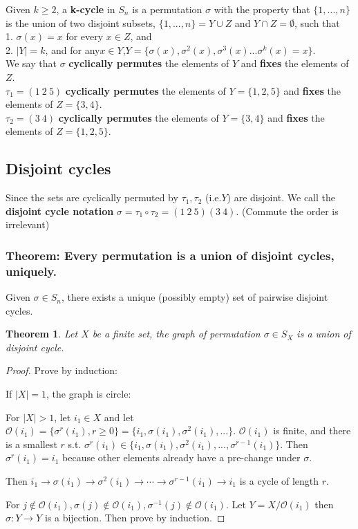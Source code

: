 \documentclass[11pt,a4paper]{article}
\newtheorem{theorem}{Theorem}
\begin{document}
Given $k \geq 2$, a \textbf{k-cycle} in $S_n$ is a permutation $\sigma$ with the property that $\{1,...,n\}$ is the union of two disjoint subsets, $\{1,...,n\}=Y \cup Z $ and $Y \cap Z =\emptyset$, such that\\
1. $\sigma(x) = x$ for every $x \in Z$, and\\
2. $|Y| = k$, and for any$ x \in Y$,$Y = \{\sigma (x), \sigma^2(x), \sigma^3(x)... \sigma^k(x) = x\}$.\\

We say that $\sigma$ \textbf{cyclically permutes} the elements of $Y$ and \textbf{fixes} the elements of $Z$.\\
$\tau_1=(1\ 2\ 5)$ \textbf{cyclically permutes} the elements of $Y=\{1,2,5\}$ and \textbf{fixes} the elements of $Z=\{3,4\}$.\\
$\tau_2=(3\ 4)$ \textbf{cyclically permutes} the elements of $Y=\{3,4\}$ and \textbf{fixes} the elements of $Z=\{1,2,5\}$.\\


\subsection{Disjoint cycles}
Since the sets are cyclically permuted by $\tau_1, \tau_2$ (i.e.$Y$) are disjoint. We call the \textbf{disjoint cycle notation} $\sigma=\tau_1\circ\tau_2=(1\ 2\ 5)(3\ 4)$. (Commute the order is irrelevant)

\subsubsection{Theorem: Every permutation is a union of disjoint
cycles, uniquely.}
Given $\sigma\in S_n$, there exists a unique (possibly empty) set of pairwise disjoint cycles.
\begin{theorem}
Let $X$ be a finite set, the graph of permutation $\sigma\in S_X$ is a union of disjoint cycle.
\end{theorem}
\begin{proof}
Prove by induction:

If $|X|=1$, the graph is circle:

For $|X|>1$, let $i_1\in X$ and let $\mathcal{O}(i_1)=\{\sigma^r(i_1),r\geq 0\}=\{i_1,\sigma(i_1),\sigma^2(i_1),...\}$. $\mathcal{O}(i_1)$ is finite, and there is a smallest $r$ s.t. $\sigma^r(i_1)\in\{i_1,\sigma(i_1),\sigma^2(i_1),...,\sigma^{r-1}(i_1)\}$. Then $\sigma^r(i_1)=i_1$ because other elements already have a pre-change under $\sigma$.

Then $i_1 \rightarrow \sigma(i_1) \rightarrow \sigma^2(i_1)\rightarrow \cdots \rightarrow \sigma^{r-1}(i_1) \rightarrow	i_1$ is a cycle of length $r$.

For $j\notin \mathcal{O}(i_1), \sigma(j)\notin \mathcal{O}(i_1), \sigma^{-1}(j)\notin \mathcal{O}(i_1)$. Let $Y=X/\mathcal{O}(i_1)$ then $\sigma: Y \rightarrow	Y$ is a bijection. Then prove by induction.

\end{proof}
\end{document}
